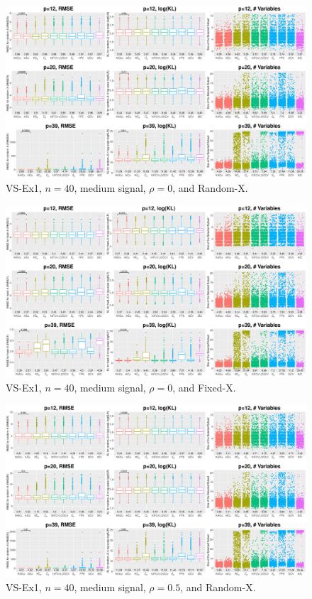 \clearpage
\begin{figure}[!ht]
\centering
\includegraphics[width=\textwidth]{figures/supplement/randomx_VS-Ex1_n40_msnr_rho0.eps}
\caption{VS-Ex1, $n=40$, medium signal, $\rho=0$, and Random-X.}
\end{figure}
\begin{figure}[!ht]
\centering
\includegraphics[width=\textwidth]{figures/supplement/fixedx_VS-Ex1_n40_msnr_rho0.eps}
\caption{VS-Ex1, $n=40$, medium signal, $\rho=0$, and Fixed-X.}
\end{figure}
\clearpage
\begin{figure}[!ht]
\centering
\includegraphics[width=\textwidth]{figures/supplement/randomx_VS-Ex1_n40_msnr_rho05.eps}
\caption{VS-Ex1, $n=40$, medium signal, $\rho=0.5$, and Random-X.}
\end{figure}
